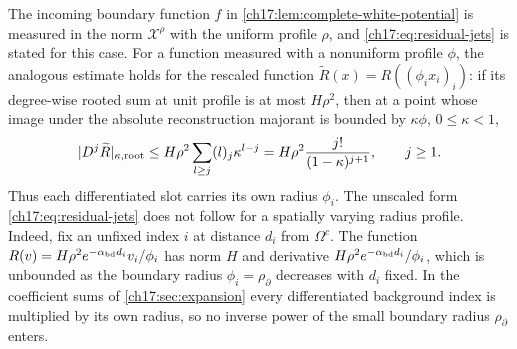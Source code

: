\begin{remark}\label{ch17:rem:profile-jets}
The incoming boundary function $f$ in \cref{ch17:lem:complete-white-potential} is measured in the norm $\mathcal X^\rho$ with the uniform profile $\rho$, and \eqref{ch17:eq:residual-jets} is stated for this case. For a function measured with a nonuniform profile $\phi$, the analogous estimate holds for the rescaled function $\widetilde R(x)=R((\phi_ix_i)_i)$: if its degree-wise rooted sum at unit profile is at most $H\rho^2$, then at a point whose image under the absolute reconstruction majorant is bounded by $\kappa\phi$, $0\le\kappa<1$,
\[
 \lvert D^j\widetilde R\rvert_{\kappa,\mathrm{root}}\le H\rho^2\sum_{l\ge j}(l)_j\kappa^{l-j}=H\rho^2\frac{j!}{(1-\kappa)^{j+1}},\qquad j\ge1.
\]
Thus each differentiated slot carries its own radius $\phi_i$. The unscaled form \eqref{ch17:eq:residual-jets} does not follow for a spatially varying radius profile. Indeed, fix an unfixed index $i$ at distance $d_i$ from $\Omega^c$. The function $R(v)=H\rho^2e^{-\alpha_{\mathrm{bd}} d_i}v_i/\phi_i$ has norm $H$ and derivative $H\rho^2e^{-\alpha_{\mathrm{bd}} d_i}/\phi_i$, which is unbounded as the boundary radius $\phi_i=\rho_\partial$ decreases with $d_i$ fixed. In the coefficient sums of \cref{ch17:sec:expansion} every differentiated background index is multiplied by its own radius, so no inverse power of the small boundary radius $\rho_\partial$ enters.
\end{remark}

